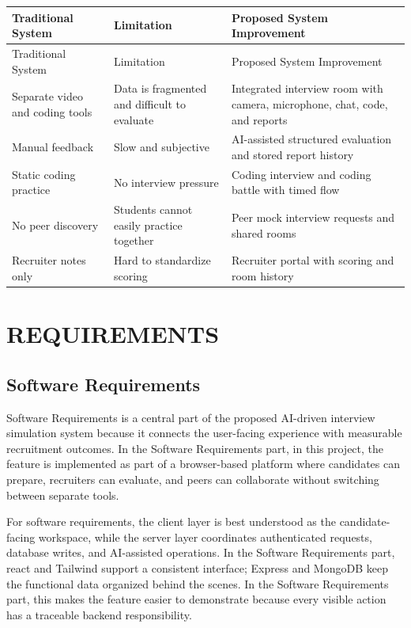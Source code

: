 \documentclass[12pt,a4paper]{report}
\begin{document}
\begin{longtable}{|>{\raggedright\arraybackslash}p{}|>{\raggedright\arraybackslash}p{}|>{\raggedright\arraybackslash}p{}|}
\hline
Traditional System & Limitation & Proposed System Improvement \\
\hline
\endfirsthead
\hline
Traditional System & Limitation & Proposed System Improvement \\
\hline
\endhead
Separate video and coding tools & Data is fragmented and difficult to evaluate & Integrated interview room with camera, microphone, chat, code, and reports \\
\hline
Manual feedback & Slow and subjective & AI-assisted structured evaluation and stored report history \\
\hline
Static coding practice & No interview pressure & Coding interview and coding battle with timed flow \\
\hline
No peer discovery & Students cannot easily practice together & Peer mock interview requests and shared rooms \\
\hline
Recruiter notes only & Hard to standardize scoring & Recruiter portal with scoring and room history \\
\hline
\end{longtable}

\chapter{REQUIREMENTS}

\section{Software Requirements}

Software Requirements is a central part of the proposed AI-driven interview simulation system because it connects the user-facing experience with measurable recruitment outcomes. In the Software Requirements part, in this project, the feature is implemented as part of a browser-based platform where candidates can prepare, recruiters can evaluate, and peers can collaborate without switching between separate tools.


For software requirements, the client layer is best understood as the candidate-facing workspace, while the server layer coordinates authenticated requests, database writes, and AI-assisted operations. In the Software Requirements part, react and Tailwind support a consistent interface; Express and MongoDB keep the functional data organized behind the scenes. In the Software Requirements part, this makes the feature easier to demonstrate because every visible action has a traceable backend responsibility.
\end{document}
